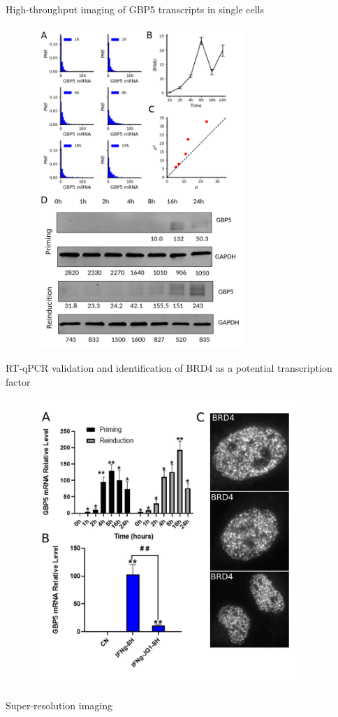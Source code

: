 \documentclass{beamer}					%
\begin{document}
\begin{frame}{High-throughput imaging of GBP5 transcripts in single cells}
\begin{figure}
\includegraphics[width=8cm]{Figure-3.png}
\end{figure}
\end{frame}

\begin{frame}{RT-qPCR validation and identification of BRD4 as a potential transcription factor}
\begin{figure}
\includegraphics[width=10cm]{Figure-4.png}
\end{figure}
\end{frame}

\begin{frame}{Super-resolution imaging}
\end{frame}
\end{document}
